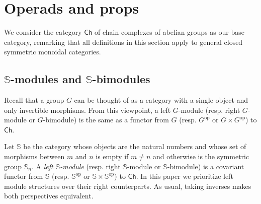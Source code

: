 \documentclass{amsart}
\renewcommand{\P}{\mathcal{P}}
\renewcommand{\S}{\mathbb{S}}
\newcommand{\minel}{\hat{0}}
\newcommand{\maxel}{\hat{1}}
\newcommand{\Ch}{\mathsf{Ch}}
\newcommand{\op}{\mathrm{op}}
\begin{document}
%
%
%
%
%
%
%

\section{Operads and props}

We consider the category $\Ch$ of chain complexes of abelian groups as our base category, remarking that all definitions in this section apply to general closed symmetric monoidal categories.

\subsection{$\S$-modules and $\S$-bimodules}
Recall that a group $G$ can be thought of as a category with a single object and only invertible morphisms. From this viewpoint, a left $G$-module (resp. right $G$-module or $G$-bimodule) is the same as a functor from $G$ (resp. $G^\op$ or $G \times G^\op$) to $\Ch$.

Let $\S$ be the category whose objects are the natural numbers and whose set of morphisms between $m$ and $n$ is empty if $m \neq n$ and otherwise is the symmetric group $\S_n$.
A \textit{left $\S$-module} (resp. right $\S$-module or $\S$-bimodule) is a covariant functor from $\S$ (resp. $\S^\op$ or $\S \times \S^\op$) to $\Ch$. In this paper we prioritize left module structures over their right counterparts. As usual, taking inverses makes both perspectives equivalent.
\end{document}
